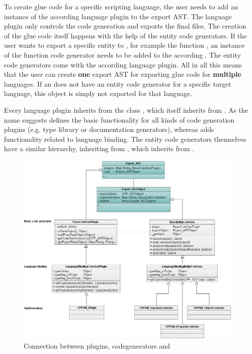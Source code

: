 To create glue code for a specific scripting language, the user needs to add an instance of the according language plugin to the export AST. The language plugin only controls the code generation and exports the final files. The creation of the glue code itself happens with the help of the entity code generators. If the user wants to export a specific  entity to , for example the function , an instance of the  function code generator needs to be added to the according . The entity code generators come with the according language plugin. All in all this means that the user can create \textbf{one} export AST for exporting glue code for \textbf{multiple} languages. If an  does not have an entity code generator for a specific target language, this object is simply not exported for that language.

Every language plugin inherits from the class , which itself inherits from . As the name suggests  defines the basic functionality for all kinds of code generation plugins (e.g. type library or documentation generators), whereas  adds functionality related to language binding. The entity code generators themselves have a similar hierarchy, inheriting from , which inherits from .

\begin{figure}[h!] %
	\centering
		\includegraphics[scale=0.4]{Images/UMLCodegen.png}
	\caption{Connection between plugins, codegenerators and }
	\label{fig:ProjectSettings}
\end{figure}


